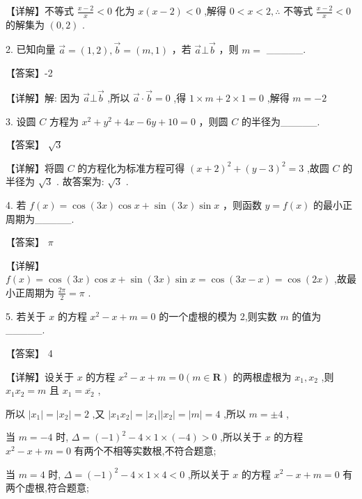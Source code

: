 \documentclass[10pt]{article}
\begin{document}
【详解】不等式 \(\frac{x - 2}{x} < 0\) 化为 \(x\left( {x - 2}\right)  < 0\) ,解得 \(0 < x < 2,\therefore\) 不等式 \(\frac{x - 2}{x} < 0\) 的解集为 \(\left( {0,2}\right)\) .

2. 已知向量 \(\overrightarrow{a} = \left( {1,2}\right) ,\overrightarrow{b} = \left( {m,1}\right)\) ，若 \(\overrightarrow{a}\bot \overrightarrow{b}\) ，则 \(m =\) \_\_\_\_\_.

【答案】-2

【详解】解: 因为 \(\overrightarrow{a}\bot \overrightarrow{b}\) ,所以 \(\overrightarrow{a} \cdot  \overrightarrow{b} = 0\) ,得 \(1 \times  m + 2 \times  1 = 0\) ,解得 \(m =  - 2\)

3. 设圆 \(C\) 方程为 \({x}^{2} + {y}^{2} + {4x} - {6y} + {10} = 0\) ，则圆 \(C\) 的半径为\_\_\_\_\_.

【答案】 \(\sqrt{3}\)

【详解】将圆 \(C\) 的方程化为标准方程可得 \({\left( x + 2\right) }^{2} + {\left( y - 3\right) }^{2} = 3\) ,故圆 \(C\) 的半径为 \(\sqrt{3}\) . 故答案为: \(\sqrt{3}\) .

4. 若 \(f\left( x\right)  = \cos \left( {3x}\right) \cos x + \sin \left( {3x}\right) \sin x\) ，则函数 \(y = f\left( x\right)\) 的最小正周期为\_\_\_\_\_.

【答案】 \(\pi\)

【详解】 \(f\left( x\right)  = \cos \left( {3x}\right) \cos x + \sin \left( {3x}\right) \sin x = \cos \left( {{3x} - x}\right)  = \cos \left( {2x}\right)\) ,故最小正周期为 \(\frac{2\pi }{2} = \pi\) .

5. 若关于 \(x\) 的方程 \({x}^{2} - x + m = 0\) 的一个虚根的模为 2,则实数 \(m\) 的值为\_\_\_\_\_.

【答案】 4

【详解】设关于 \(x\) 的方程 \({x}^{2} - x + m = 0\left( {m \in  \mathbf{R}}\right)\) 的两根虚根为 \({x}_{1},{x}_{2}\) ,则 \({x}_{1}{x}_{2} = m\) 且 \({x}_{1} = \overline{{x}_{2}}\) ,

所以 \(\left| {x}_{1}\right|  = \left| {x}_{2}\right|  = 2\) ,又 \(\left| {{x}_{1}{x}_{2}}\right|  = \left| {x}_{1}\right| \left| {x}_{2}\right|  = \left| m\right|  = 4\) ,所以 \(m =  \pm  4\) ,

当 \(m =  - 4\) 时, \(\Delta  = {\left( -1\right) }^{2} - 4 \times  1 \times  \left( {-4}\right)  > 0\) ,所以关于 \(x\) 的方程 \({x}^{2} - x + m = 0\) 有两个不相等实数根,不符合题意;

当 \(m = 4\) 时, \(\Delta  = {\left( -1\right) }^{2} - 4 \times  1 \times  4 < 0\) ,所以关于 \(x\) 的方程 \({x}^{2} - x + m = 0\) 有两个虚根,符合题意;
\end{document}
